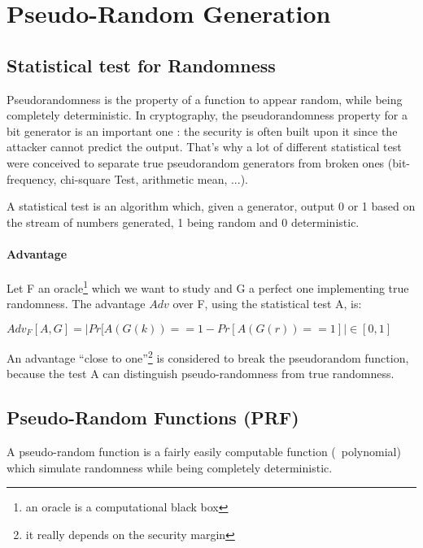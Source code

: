 \section{ Pseudo-Random Generation }

\subsection{Statistical test for Randomness}

Pseudorandomness is the property of a function to appear random, while being completely deterministic. In cryptography, the pseudorandomness property for a bit generator is an important one : the security is often built upon it since the attacker cannot predict the output. That's why a lot of different statistical test were conceived to separate true pseudorandom generators from broken ones (bit-frequency, chi-square Test, arithmetic mean, ...).

\begin{mydef}
A statistical test is an algorithm which, given a generator, output 0 or 1 based on the stream of numbers generated, 1 being random and 0 deterministic.
\end{mydef}

\paragraph{Advantage \\}
\label{sec:advantage}

Let F an oracle\footnote{an oracle is a computational black box} which we want to study and G a perfect one implementing true randomness. The advantage $Adv$ over F, using the statistical test A, is: 
\begin{mydef}
$Adv_{F} [A,G] = | Pr[A(G(k)) == 1  - Pr[A(G(r)) == 1] | \in  [0,1] $
\end{mydef}

An advantage ``close to one''\footnote{it really depends on the security margin} is considered to break the pseudorandom function, because the test A can distinguish pseudo-randomness from true randomness.


\subsection{Pseudo-Random Functions   (PRF)}

A pseudo-random function is a fairly easily computable function (~polynomial) which simulate randomness while being completely deterministic.

